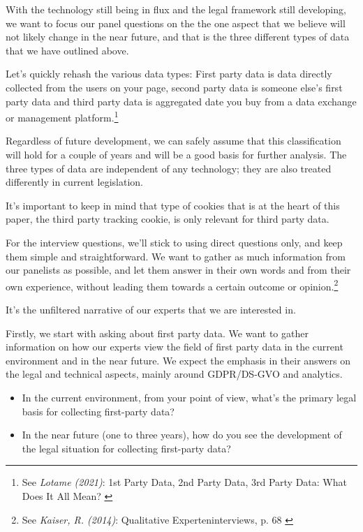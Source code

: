 With the technology still being in flux and the legal framework still developing, we want to focus our panel questions on the the one aspect that we believe will not likely change in the near future, and that is the three different types of data that we have outlined above.

Let's quickly rehash the various data types: First party data is data directly collected from the users on your page, second party data is someone else's first party data and third party data is aggregated date you buy from a data exchange or management platform.\footnote{See \textit{Lotame (2021)}: 1st Party Data, 2nd Party Data, 3rd Party Data: What Does It All Mean? \cite{lotameRehash}}

Regardless of future development, we can safely assume that this classification will hold for a couple of years and will be a good basis for further analysis. The three types of data are independent of any technology; they are also treated differently in current legislation.

It's important to keep in mind that type of cookies that is at the heart of this paper, the third party tracking cookie, is only relevant for third party data.

For the interview questions, we'll stick to using direct questions only, and keep them simple and straightforward. We want to gather as much information from our panelists as possible, and let them answer in their own words and from their own experience, without leading them towards a certain outcome or opinion.\footnote{See \textit{Kaiser, R. (2014)}: Qualitative Experteninterviews, p. 68 \cite{expertInterviews}} 

It's the unfiltered narrative of our experts that we are interested in.

Firstly, we start with asking about first party data. We want to gather information on how our experts view the field of first party data in the current environment and in the near future. We expect the emphasis in their answers on the legal and technical aspects, mainly around GDPR/DS-GVO and analytics.

\begin{itemize}
 \item In the current environment, from your point of view, what's the primary legal basis for collecting first-party data?
 \item In the near future (one to three years), how do you see the development of the legal situation for collecting first-party data?
\end{itemize}
 
